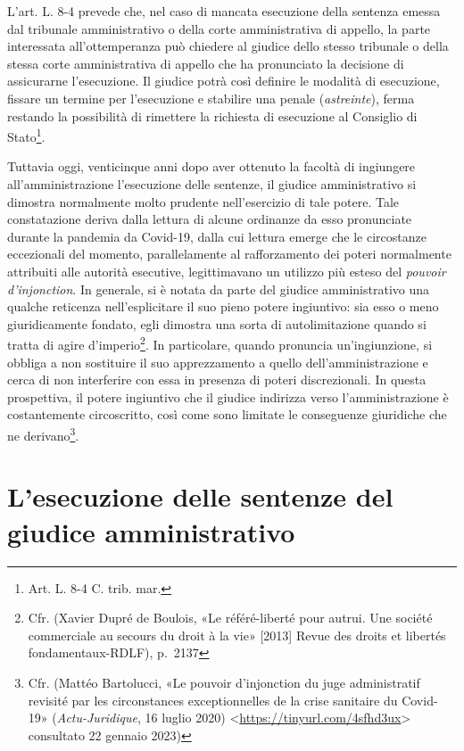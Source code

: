 \documentclass[12pt,it,a4paper,]{report}
\begin{document}
L'art. L. 8-4 prevede che, nel caso di mancata esecuzione della sentenza
emessa dal tribunale amministrativo o della corte amministrativa di
appello, la parte interessata all'ottemperanza può chiedere al giudice
dello stesso tribunale o della stessa corte amministrativa di appello
che ha pronunciato la decisione di assicurarne l'esecuzione. Il giudice
potrà così definire le modalità di esecuzione, fissare un termine per
l'esecuzione e stabilire una penale (\emph{astreinte}), ferma restando
la possibilità di rimettere la richiesta di esecuzione al Consiglio di
Stato\footnote{Art. L. 8-4 C. trib. mar.}.

Tuttavia oggi, venticinque anni dopo aver ottenuto la facoltà di
ingiungere all'amministrazione l'esecuzione delle sentenze, il giudice
amministrativo si dimostra normalmente molto prudente nell'esercizio di
tale potere. Tale constatazione deriva dalla lettura di alcune ordinanze
da esso pronunciate durante la pandemia da Covid-19, dalla cui lettura
emerge che le circostanze eccezionali del momento, parallelamente al
rafforzamento dei poteri normalmente attribuiti alle autorità esecutive,
legittimavano un utilizzo più esteso del \emph{pouvoir d'injonction}. In
generale, si è notata da parte del giudice amministrativo una qualche
reticenza nell'esplicitare il suo pieno potere ingiuntivo: sia esso o
meno giuridicamente fondato, egli dimostra una sorta di autolimitazione
quando si tratta di agire d'imperio\footnote{Cfr. (Xavier Dupré de
  Boulois, {«Le référé-liberté pour autrui. Une société commerciale au
  secours du droit à la vie»} {[}2013{]} Revue des droits et libertés
  fondamentaux-RDLF), p.~2137}. In particolare, quando pronuncia
un'ingiunzione, si obbliga a non sostituire il suo apprezzamento a
quello dell'amministrazione e cerca di non interferire con essa in
presenza di poteri discrezionali. In questa prospettiva, il potere
ingiuntivo che il giudice indirizza verso l'amministrazione è
costantemente circoscritto, così come sono limitate le conseguenze
giuridiche che ne derivano\footnote{Cfr. (Mattéo Bartolucci, {«Le
  pouvoir d'injonction du juge administratif revisité par les
  circonstances exceptionnelles de la crise sanitaire du Covid-19»}
  (\emph{Actu-Juridique}, 16 luglio 2020)
  \textless{}\url{https://tinyurl.com/4sfhd3ux}\textgreater{} consultato
  22 gennaio 2023)}.

\hypertarget{lesecuzione-delle-sentenze-del-giudice-amministrativo}{%
\section{L'esecuzione delle sentenze del giudice
amministrativo}\label{lesecuzione-delle-sentenze-del-giudice-amministrativo}}
\end{document}
